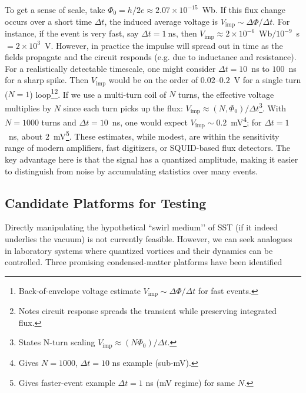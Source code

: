 \documentclass[12pt]{article}
\begin{document}
To get a sense of scale, take $\Phi_{0}=h/2e\approx2.07\times10^{-15}$~Wb. If this flux change occurs over a short time $\Delta t$, the induced average voltage is $V_{\text{imp}} \sim \Delta \Phi/\Delta t$. For instance, if the event is very fast, say $\Delta t = 1~\text{ns}$, then $V_{\text{imp}}\approx 2\times10^{-6}$~Wb$/10^{-9}$~s $= 2\times10^{3}$~V. However, in practice the impulse will spread out in time as the fields propagate and the circuit responds (e.g. due to inductance and resistance). For a realistically detectable timescale, one might consider $\Delta t = 10$~ns to $100$~ns for a sharp spike. Then $V_{\text{imp}}$ would be on the order of $0.02$--$0.2$~V for a single turn ($N=1$) loop\footnote{Back-of-envelope voltage estimate $V_{\text{imp}}\sim\Delta\Phi/\Delta t$ for fast events.}\footnote{Notes circuit response spreads the transient while preserving integrated flux.}. If we use a multi-turn coil of $N$ turns, the effective voltage multiplies by $N$ since each turn picks up the flux: $V_{\text{imp}} \approx (N,\Phi_{0})/\Delta t$\footnote{States N-turn scaling $V_{\text{imp}}\approx (N\Phi_0)/\Delta t$.}. With $N=1000$ turns and $\Delta t=10$~ns, one would expect $V_{\text{imp}}\sim 0.2$~mV\footnote{Gives $N=1000$, $\Delta t=10$ ns example (sub-mV).}; for $\Delta t=1$~ns, about $2$~mV\footnote{Gives faster-event example $\Delta t=1$ ns (mV regime) for same $N$.}. These estimates, while modest, are within the sensitivity range of modern amplifiers, fast digitizers, or SQUID-based flux detectors. The key advantage here is that the signal has a quantized amplitude, making it easier to distinguish from noise by accumulating statistics over many events.





\subsection{Candidate Platforms for Testing}

Directly manipulating the hypothetical ``swirl medium’’ of SST (if it indeed underlies the vacuum) is not currently feasible. However, we can seek analogues in laboratory systems where quantized vortices and their dynamics can be controlled. Three promising condensed-matter platforms have been identified \cite{Deaver1961,Doll1961}
\end{document}
